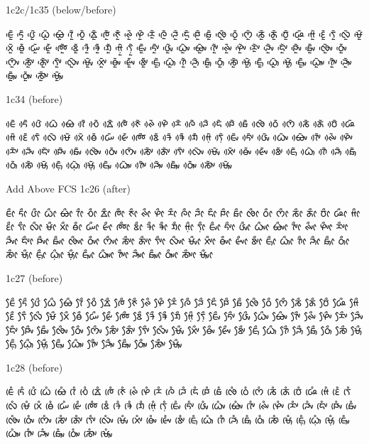 \noindent
1c2c/1c35 (below/before)

\noindent
ᰀᰬᰵᰶ ᰁᰬᰵᰶ ᰂᰬᰵᰶ ᰃᰬᰵᰶ ᰄᰬᰵᰶ ᰅᰬᰵᰶ ᰆᰬᰵᰶ ᰇᰬᰵᰶ ᰈᰬᰵᰶ ᰉᰬᰵᰶ ᰊᰬᰵᰶ ᰋᰬᰵᰶ ᰌᰬᰵᰶ ᰍᰬᰵᰶ ᰎᰬᰵᰶ ᰏᰬᰵᰶ ᰐᰬᰵᰶ ᰑᰬᰵᰶ ᰒᰬᰵᰶ ᰓᰬᰵᰶ ᰔᰬᰵᰶ ᰕᰬᰵᰶ ᰖᰬᰵᰶ ᰗᰬᰵᰶ ᰘᰬᰵᰶ ᰙᰬᰵᰶ ᰚᰬᰵᰶ ᰛᰬᰵᰶ ᰜᰬᰵᰶ ᰝᰬᰵᰶ ᰞᰬᰵᰶ ᰟᰬᰵᰶ ᰠᰬᰵᰶ ᰡᰬᰵᰶ ᰢᰬᰵᰶ ᰣᰬᰵᰶ ᱍᰬᰵᰶ ᱎᰬᰵᰶ ᱏᰬᰵᰶ ᰙ᰷ᰬᰵᰶ ᰛ᰷ᰬᰵᰶ ᰀᰤᰬᰵᰶ ᰁᰤᰬᰵᰶ ᰂᰤᰬᰵᰶ ᰃᰤᰬᰵᰶ ᰄᰤᰬᰵᰶ ᰅᰤᰬᰵᰶ ᰊᰤᰬᰵᰶ ᰋᰤᰬᰵᰶ ᰌᰤᰬᰵᰶ ᰎᰤᰬᰵᰶ ᰏᰤᰬᰵᰶ ᰐᰤᰬᰵᰶ ᰑᰤᰬᰵᰶ ᰒᰤᰬᰵᰶ ᰓᰤᰬᰵᰶ ᰔᰤᰬᰵᰶ ᰕᰤᰬᰵᰶ ᰖᰤᰬᰵᰶ ᰛᰤᰬᰵᰶ ᰜᰤᰬᰵᰶ ᰝᰤᰬᰵᰶ ᰞᰤᰬᰵᰶ ᰟᰤᰬᰵᰶ ᰡᰤᰬᰵᰶ ᰣᰤᰬᰵᰶ ᰀᰥᰬᰵᰶ ᰃᰥᰬᰵᰶ ᰅᰥᰬᰵᰶ ᰎᰥᰬᰵᰶ ᰑᰥᰬᰵᰶ ᰓᰥᰬᰵᰶ ᰕᰥᰬᰵᰶ ᰝᰥᰬᰵᰶ ᰀ᰷ᰥᰬᰵᰶ ᰃ᰷ᰥᰬᰵᰶ ᰝ᰷ᰥᰬᰵᰶ ᰀᰥᰤᰬᰵᰶ ᰃᰥᰤᰬᰵᰶ ᰅᰥᰤᰬᰵᰶ ᰎᰥᰤᰬᰵᰶ ᰑᰥᰤᰬᰵᰶ ᰓᰥᰤᰬᰵᰶ ᰕᰥᰤᰬᰵᰶ ᰝᰥᰤᰬᰵᰶ 

\noindent
1c34 (before)

\noindent
ᰀᰴᰶ ᰁᰴᰶ ᰂᰴᰶ ᰃᰴᰶ ᰄᰴᰶ ᰅᰴᰶ ᰆᰴᰶ ᰇᰴᰶ ᰈᰴᰶ ᰉᰴᰶ ᰊᰴᰶ ᰋᰴᰶ ᰌᰴᰶ ᰍᰴᰶ ᰎᰴᰶ ᰏᰴᰶ ᰐᰴᰶ ᰑᰴᰶ ᰒᰴᰶ ᰓᰴᰶ ᰔᰴᰶ ᰕᰴᰶ ᰖᰴᰶ ᰗᰴᰶ ᰘᰴᰶ ᰙᰴᰶ ᰚᰴᰶ ᰛᰴᰶ ᰜᰴᰶ ᰝᰴᰶ ᰞᰴᰶ ᰟᰴᰶ ᰠᰴᰶ ᰡᰴᰶ ᰢᰴᰶ ᰣᰴᰶ ᱍᰴᰶ ᱎᰴᰶ ᱏᰴᰶ ᰙ᰷ᰴᰶ ᰛ᰷ᰴᰶ ᰀᰤᰴᰶ ᰁᰤᰴᰶ ᰂᰤᰴᰶ ᰃᰤᰴᰶ ᰄᰤᰴᰶ ᰅᰤᰴᰶ ᰊᰤᰴᰶ ᰋᰤᰴᰶ ᰌᰤᰴᰶ ᰎᰤᰴᰶ ᰏᰤᰴᰶ ᰐᰤᰴᰶ ᰑᰤᰴᰶ ᰒᰤᰴᰶ ᰓᰤᰴᰶ ᰔᰤᰴᰶ ᰕᰤᰴᰶ ᰖᰤᰴᰶ ᰛᰤᰴᰶ ᰜᰤᰴᰶ ᰝᰤᰴᰶ ᰞᰤᰴᰶ ᰟᰤᰴᰶ ᰡᰤᰴᰶ ᰣᰤᰴᰶ ᰀᰥᰴᰶ ᰃᰥᰴᰶ ᰅᰥᰴᰶ ᰎᰥᰴᰶ ᰑᰥᰴᰶ ᰓᰥᰴᰶ ᰕᰥᰴᰶ ᰝᰥᰴᰶ ᰀ᰷ᰥᰴᰶ ᰃ᰷ᰥᰴᰶ ᰝ᰷ᰥᰴᰶ ᰀᰥᰤᰴᰶ ᰃᰥᰤᰴᰶ ᰅᰥᰤᰴᰶ ᰎᰥᰤᰴᰶ ᰑᰥᰤᰴᰶ ᰓᰥᰤᰴᰶ ᰕᰥᰤᰴᰶ ᰝᰥᰤᰴᰶ 

\noindent
Add Above FCS
\noindent
1c26 (after)

\noindent
ᰀᰦᰰ ᰁᰦᰰ ᰂᰦᰰ ᰃᰦᰰ ᰄᰦᰰ ᰅᰦᰰ ᰆᰦᰰ ᰇᰦᰰ ᰈᰦᰰ ᰉᰦᰰ ᰊᰦᰰ ᰋᰦᰰ ᰌᰦᰰ ᰍᰦᰰ ᰎᰦᰰ ᰏᰦᰰ ᰐᰦᰰ ᰑᰦᰰ ᰒᰦᰰ ᰓᰦᰰ ᰔᰦᰰ ᰕᰦᰰ ᰖᰦᰰ ᰗᰦᰰ ᰘᰦᰰ ᰙᰦᰰ ᰚᰦᰰ ᰛᰦᰰ ᰜᰦᰰ ᰝᰦᰰ ᰞᰦᰰ ᰟᰦᰰ ᰠᰦᰰ ᰡᰦᰰ ᰢᰦᰰ ᰣᰦᰰ ᱍᰦᰰ ᱎᰦᰰ ᱏᰦᰰ ᰙ᰷ᰦᰰ ᰛ᰷ᰦᰰ ᰀᰤᰦᰰ ᰁᰤᰦᰰ ᰂᰤᰦᰰ ᰃᰤᰦᰰ ᰄᰤᰦᰰ ᰅᰤᰦᰰ ᰊᰤᰦᰰ ᰋᰤᰦᰰ ᰌᰤᰦᰰ ᰎᰤᰦᰰ ᰏᰤᰦᰰ ᰐᰤᰦᰰ ᰑᰤᰦᰰ ᰒᰤᰦᰰ ᰓᰤᰦᰰ ᰔᰤᰦᰰ ᰕᰤᰦᰰ ᰖᰤᰦᰰ ᰛᰤᰦᰰ ᰜᰤᰦᰰ ᰝᰤᰦᰰ ᰞᰤᰦᰰ ᰟᰤᰦᰰ ᰡᰤᰦᰰ ᰣᰤᰦᰰ ᰀᰥᰦᰰ ᰃᰥᰦᰰ ᰅᰥᰦᰰ ᰎᰥᰦᰰ ᰑᰥᰦᰰ ᰓᰥᰦᰰ ᰕᰥᰦᰰ ᰝᰥᰦᰰ ᰀ᰷ᰥᰦᰰ ᰃ᰷ᰥᰦᰰ ᰝ᰷ᰥᰦᰰ ᰀᰥᰤᰦᰰ ᰃᰥᰤᰦᰰ ᰅᰥᰤᰦᰰ ᰎᰥᰤᰦᰰ ᰑᰥᰤᰦᰰ ᰓᰥᰤᰦᰰ ᰕᰥᰤᰦᰰ ᰝᰥᰤᰦᰰ 

\noindent
1c27 (before)

\noindent
ᰀᰧᰰ ᰁᰧᰰ ᰂᰧᰰ ᰃᰧᰰ ᰄᰧᰰ ᰅᰧᰰ ᰆᰧᰰ ᰇᰧᰰ ᰈᰧᰰ ᰉᰧᰰ ᰊᰧᰰ ᰋᰧᰰ ᰌᰧᰰ ᰍᰧᰰ ᰎᰧᰰ ᰏᰧᰰ ᰐᰧᰰ ᰑᰧᰰ ᰒᰧᰰ ᰓᰧᰰ ᰔᰧᰰ ᰕᰧᰰ ᰖᰧᰰ ᰗᰧᰰ ᰘᰧᰰ ᰙᰧᰰ ᰚᰧᰰ ᰛᰧᰰ ᰜᰧᰰ ᰝᰧᰰ ᰞᰧᰰ ᰟᰧᰰ ᰠᰧᰰ ᰡᰧᰰ ᰢᰧᰰ ᰣᰧᰰ ᱍᰧᰰ ᱎᰧᰰ ᱏᰧᰰ ᰙ᰷ᰧᰰ ᰛ᰷ᰧᰰ ᰀᰤᰧᰰ ᰁᰤᰧᰰ ᰂᰤᰧᰰ ᰃᰤᰧᰰ ᰄᰤᰧᰰ ᰅᰤᰧᰰ ᰊᰤᰧᰰ ᰋᰤᰧᰰ ᰌᰤᰧᰰ ᰎᰤᰧᰰ ᰏᰤᰧᰰ ᰐᰤᰧᰰ ᰑᰤᰧᰰ ᰒᰤᰧᰰ ᰓᰤᰧᰰ ᰔᰤᰧᰰ ᰕᰤᰧᰰ ᰖᰤᰧᰰ ᰛᰤᰧᰰ ᰜᰤᰧᰰ ᰝᰤᰧᰰ ᰞᰤᰧᰰ ᰟᰤᰧᰰ ᰡᰤᰧᰰ ᰣᰤᰧᰰ ᰀᰥᰧᰰ ᰃᰥᰧᰰ ᰅᰥᰧᰰ ᰎᰥᰧᰰ ᰑᰥᰧᰰ ᰓᰥᰧᰰ ᰕᰥᰧᰰ ᰝᰥᰧᰰ ᰀ᰷ᰥᰧᰰ ᰃ᰷ᰥᰧᰰ ᰝ᰷ᰥᰧᰰ ᰀᰥᰤᰧᰰ ᰃᰥᰤᰧᰰ ᰅᰥᰤᰧᰰ ᰎᰥᰤᰧᰰ ᰑᰥᰤᰧᰰ ᰓᰥᰤᰧᰰ ᰕᰥᰤᰧᰰ ᰝᰥᰤᰧᰰ 

\noindent
1c28 (before)

\noindent
ᰀᰨᰱ ᰁᰨᰱ ᰂᰨᰱ ᰃᰨᰱ ᰄᰨᰱ ᰅᰨᰱ ᰆᰨᰱ ᰇᰨᰱ ᰈᰨᰱ ᰉᰨᰱ ᰊᰨᰱ ᰋᰨᰱ ᰌᰨᰱ ᰍᰨᰱ ᰎᰨᰱ ᰏᰨᰱ ᰐᰨᰱ ᰑᰨᰱ ᰒᰨᰱ ᰓᰨᰱ ᰔᰨᰱ ᰕᰨᰱ ᰖᰨᰱ ᰗᰨᰱ ᰘᰨᰱ ᰙᰨᰱ ᰚᰨᰱ ᰛᰨᰱ ᰜᰨᰱ ᰝᰨᰱ ᰞᰨᰱ ᰟᰨᰱ ᰠᰨᰱ ᰡᰨᰱ ᰢᰨᰱ ᰣᰨᰱ ᱍᰨᰱ ᱎᰨᰱ ᱏᰨᰱ ᰙ᰷ᰨᰱ ᰛ᰷ᰨᰱ ᰀᰤᰨᰱ ᰁᰤᰨᰱ ᰂᰤᰨᰱ ᰃᰤᰨᰱ ᰄᰤᰨᰱ ᰅᰤᰨᰱ ᰊᰤᰨᰱ ᰋᰤᰨᰱ ᰌᰤᰨᰱ ᰎᰤᰨᰱ ᰏᰤᰨᰱ ᰐᰤᰨᰱ ᰑᰤᰨᰱ ᰒᰤᰨᰱ ᰓᰤᰨᰱ ᰔᰤᰨᰱ ᰕᰤᰨᰱ ᰖᰤᰨᰱ ᰛᰤᰨᰱ ᰜᰤᰨᰱ ᰝᰤᰨᰱ ᰞᰤᰨᰱ ᰟᰤᰨᰱ ᰡᰤᰨᰱ ᰣᰤᰨᰱ ᰀᰥᰨᰱ ᰃᰥᰨᰱ ᰅᰥᰨᰱ ᰎᰥᰨᰱ ᰑᰥᰨᰱ ᰓᰥᰨᰱ ᰕᰥᰨᰱ ᰝᰥᰨᰱ ᰀ᰷ᰥᰨᰱ ᰃ᰷ᰥᰨᰱ ᰝ᰷ᰥᰨᰱ ᰀᰥᰤᰨᰱ ᰃᰥᰤᰨᰱ ᰅᰥᰤᰨᰱ ᰎᰥᰤᰨᰱ ᰑᰥᰤᰨᰱ ᰓᰥᰤᰨᰱ ᰕᰥᰤᰨᰱ ᰝᰥᰤᰨᰱ 

